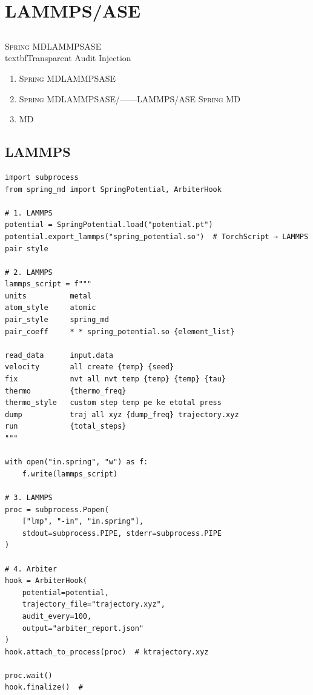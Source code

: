 \documentclass[12pt,a4paper]{article}
\theoremstyle{remark}
\newcommand{\SpringMD}{\textsc{Spring MD}}
\begin{document}
\section{LAMMPS/ASE}

\subsection{}

\SpringMD{}LAMMPSASE\\textbf{}Transparent Audit Injection


\begin{enumerate}[label=(\arabic*),itemsep=3pt]
    \item \SpringMD{}LAMMPSASE
    \item \SpringMD{}LAMMPSASE/——LAMMPS/ASE
    \SpringMD{}
    \item MD
\end{enumerate}

\subsection{LAMMPS}

\begin{lstlisting}[caption={LAMMPSPython},label=lst:lammps_integration]
import subprocess
from spring_md import SpringPotential, ArbiterHook

# 1. LAMMPS
potential = SpringPotential.load("potential.pt")
potential.export_lammps("spring_potential.so")  # TorchScript → LAMMPS pair style

# 2. LAMMPS
lammps_script = f"""
units          metal
atom_style     atomic
pair_style     spring_md
pair_coeff     * * spring_potential.so {element_list}

read_data      input.data
velocity       all create {temp} {seed}
fix            nvt all nvt temp {temp} {temp} {tau}
thermo         {thermo_freq}
thermo_style   custom step temp pe ke etotal press
dump           traj all xyz {dump_freq} trajectory.xyz
run            {total_steps}
"""

with open("in.spring", "w") as f:
    f.write(lammps_script)

# 3. LAMMPS
proc = subprocess.Popen(
    ["lmp", "-in", "in.spring"],
    stdout=subprocess.PIPE, stderr=subprocess.PIPE
)

# 4. Arbiter
hook = ArbiterHook(
    potential=potential,
    trajectory_file="trajectory.xyz",
    audit_every=100,
    output="arbiter_report.json"
)
hook.attach_to_process(proc)  # ktrajectory.xyz

proc.wait()
hook.finalize()  # 
\end{lstlisting}
\end{document}
